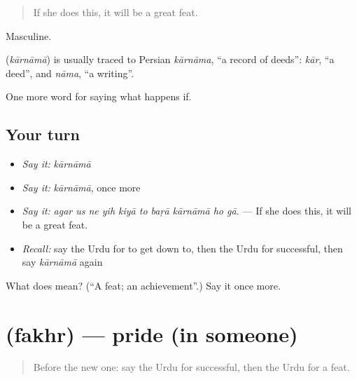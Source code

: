 \begin{quote}
If she does this, it will be a great feat.
\end{quote}

Masculine.

\begin{cousinweb}
\textbf{} (\emph{kārnāmā}) is usually traced to Persian \emph{kārnāma}, \textquotedblleft{}a record of deeds\textquotedblright{}: \emph{kār}, \textquotedblleft{}a deed\textquotedblright{}, and \emph{nāma}, \textquotedblleft{}a writing\textquotedblright{}.
\end{cousinweb}

\begin{grammarlens}[title={What you've built}]
One more word for saying what happens if.
\end{grammarlens}

\subsection*{Your turn}
\begin{itemize}
\raggedright
  \item \emph{Say it:} \emph{kārnāmā}
  \item \emph{Say it:} \emph{kārnāmā}, once more
  \item \emph{Say it:} \emph{agar us ne yih kiyā to baṛā kārnāmā ho gā.} — If she does this, it will be a great feat.
  \item \emph{Recall:} say the Urdu for to get down to, then the Urdu for successful, then say \emph{kārnāmā} again
\end{itemize}

\begin{tcolorbox}[breakable,colback=teal!4,colframe=teal!35!black,title={Before you move on}]
What does  mean? (\textquotedblleft{}A feat; an achievement\textquotedblright{}.) Say it once more.
\end{tcolorbox}
\section[\texorpdfstring{\ur{فخر} (fakhr)}{فخر (fakhr)}]{ (fakhr) — pride (in someone)}

\label{lesson:UR-C381-fakhr}



\begin{quote}
Before the new one: say the Urdu for successful, then the Urdu for a feat.
\end{quote}

